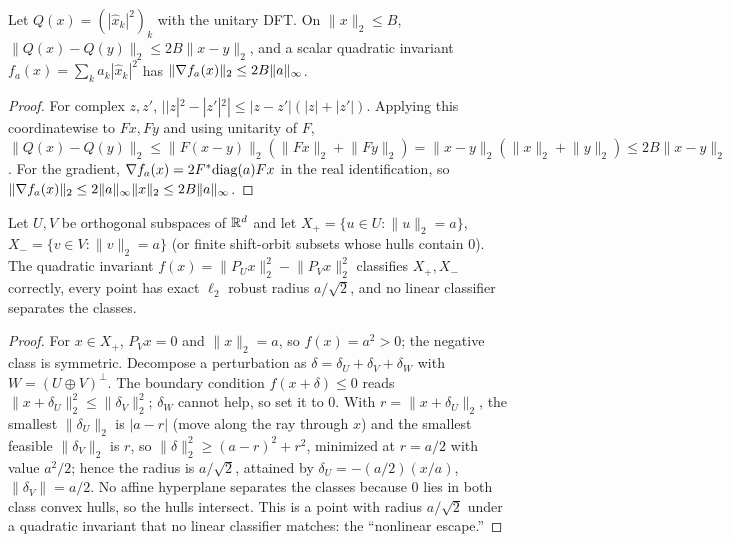 \begin{lemma}\label{lem:ps-lip-app}
Let $Q(x)=(|\hat x_k|^2)_k$ with the unitary DFT. On $\lVert x\rVert_2\le B$,
$\lVert Q(x)-Q(y)\rVert_2\le2B\lVert x-y\rVert_2$, and a scalar quadratic
invariant $f_a(x)=\sum_ka_k|\hat x_k|^2$ has
$\lVert\nabla f_a(x)\rVert_2\le2B\lVert a\rVert_\infty$.
\end{lemma}
\begin{proof}
For complex $z,z'$, $||z|^2-|z'|^2|\le|z-z'|(|z|+|z'|)$. Applying this
coordinatewise to $Fx,Fy$ and using unitarity of $F$,
$\lVert Q(x)-Q(y)\rVert_2\le\lVert F(x-y)\rVert_2(\lVert Fx\rVert_2+\lVert Fy\rVert_2)
=\lVert x-y\rVert_2(\lVert x\rVert_2+\lVert y\rVert_2)\le2B\lVert x-y\rVert_2$.
For the gradient, $\nabla f_a(x)=2F^{*}\mathrm{diag}(a)Fx$ in the real
identification, so $\lVert\nabla f_a(x)\rVert_2\le2\lVert a\rVert_\infty\lVert x\rVert_2\le2B\lVert a\rVert_\infty$.
\end{proof}

\begin{proposition}\label{prop:toy-app}
Let $U,V$ be orthogonal subspaces of $\mathbb{R}^d$ and let
$X_+=\{u\in U:\lVert u\rVert_2=a\}$, $X_-=\{v\in V:\lVert v\rVert_2=a\}$ (or
finite shift-orbit subsets whose hulls contain $0$). The quadratic invariant
$f(x)=\lVert P_Ux\rVert_2^2-\lVert P_Vx\rVert_2^2$ classifies $X_+,X_-$
correctly, every point has exact $\ell_2$ robust radius $a/\sqrt2$, and no linear
classifier separates the classes.
\end{proposition}
\begin{proof}
For $x\in X_+$, $P_Vx=0$ and $\lVert x\rVert_2=a$, so $f(x)=a^2>0$; the negative
class is symmetric. Decompose a perturbation as $\delta=\delta_U+\delta_V+\delta_W$
with $W=(U\oplus V)^\perp$. The boundary condition $f(x+\delta)\le0$ reads
$\lVert x+\delta_U\rVert_2^2\le\lVert\delta_V\rVert_2^2$; $\delta_W$ cannot help,
so set it to $0$. With $r=\lVert x+\delta_U\rVert_2$, the smallest
$\lVert\delta_U\rVert_2$ is $|a-r|$ (move along the ray through $x$) and the
smallest feasible $\lVert\delta_V\rVert_2$ is $r$, so
$\lVert\delta\rVert_2^2\ge(a-r)^2+r^2$, minimized at $r=a/2$ with value $a^2/2$;
hence the radius is $a/\sqrt2$, attained by $\delta_U=-(a/2)(x/a)$,
$\lVert\delta_V\rVert=a/2$. No affine hyperplane separates the classes because
$0$ lies in both class convex hulls, so the hulls intersect. This is a point with
radius $a/\sqrt2$ under a quadratic invariant that no linear classifier matches:
the ``nonlinear escape.''
\end{proof}

